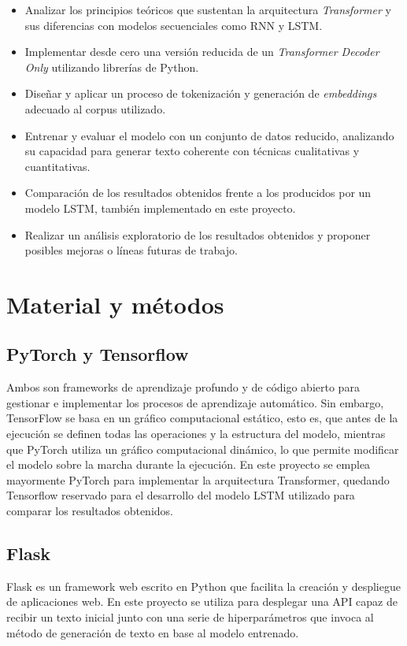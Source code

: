 \documentclass[11pt]{book}
\newcommand{\clearemptydoublepage}{\newpage{\pagestyle{empty}\cleardoublepage}}
\begin{document}
\begin{itemize}
    \item Analizar los principios teóricos que sustentan la arquitectura \textit{Transformer} y sus diferencias con modelos secuenciales como RNN y LSTM.
    \item Implementar desde cero una versión reducida de un \textit{Transformer Decoder Only} utilizando librerías de Python.
    \item Diseñar y aplicar un proceso de tokenización y generación de \textit{embeddings} adecuado al corpus utilizado.
    \item Entrenar y evaluar el modelo con un conjunto de datos reducido, analizando su capacidad para generar texto coherente con técnicas cualitativas y cuantitativas.
    \item Comparación de los resultados obtenidos frente a los producidos por un modelo LSTM, también implementado en este proyecto.
    \item Realizar un análisis exploratorio de los resultados obtenidos y proponer posibles mejoras o líneas futuras de trabajo.
\end{itemize}



\clearemptydoublepage

\chapter{Material y métodos}
\section{PyTorch y Tensorflow}
Ambos son frameworks de aprendizaje profundo y de código abierto para gestionar e implementar los procesos de aprendizaje automático. Sin embargo, TensorFlow se basa en un gráfico computacional estático, esto es, que antes de la ejecución se definen todas las operaciones y la estructura del modelo, mientras que PyTorch utiliza un gráfico computacional dinámico, lo que permite modificar el modelo sobre la marcha durante la ejecución.
En este proyecto se emplea mayormente PyTorch para implementar la arquitectura Transformer, quedando Tensorflow reservado para el desarrollo del modelo LSTM utilizado para comparar los resultados obtenidos.

\section{Flask}
Flask es un framework web escrito en Python que facilita la creación y despliegue de aplicaciones web. En este proyecto se utiliza para desplegar una API capaz de recibir un texto inicial junto con una serie de hiperparámetros que invoca al método de generación de texto en base al modelo entrenado.
\end{document}
